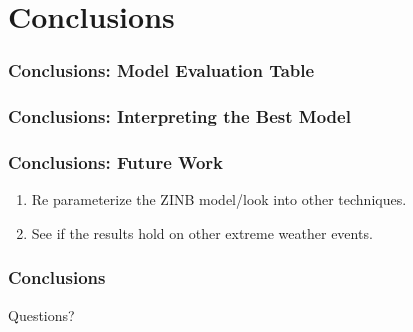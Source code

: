\documentclass{beamer}
\begin{document}
	\section{Conclusions}
	\begin{frame}
		\frametitle{Conclusions: Model Evaluation Table}
	\end{frame}
	\begin{frame}
		\frametitle{Conclusions: Interpreting the Best Model}
	\end{frame}
	\begin{frame}
		\frametitle{Conclusions: Future Work}
		\begin{enumerate}
			\item{Re parameterize the ZINB model/look into other techniques.}
			\item{See if the results hold on other extreme weather events.}
		\end{enumerate}
	\end{frame}
	\begin{frame}
		\frametitle{Conclusions}
		Questions?
	\end{frame}
	
\end{document}
